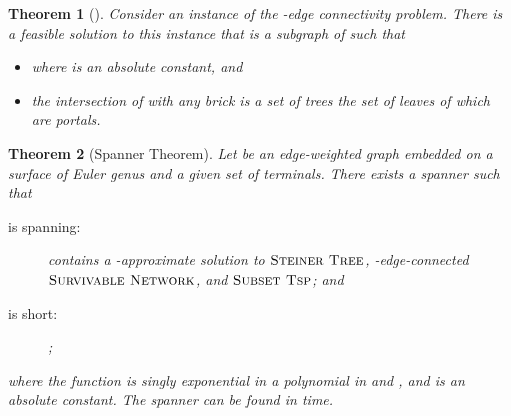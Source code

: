 \documentclass{article}
\newtheorem{theorem}{Theorem}
\newcommand{\myproblemname}[1]{\ensuremath{\mbox{\sc #1}}\xspace}
\newcommand{\steiner}{\myproblemname{Steiner Tree}}
\newcommand{\subtsp}{\myproblemname{Subset Tsp}}
\newcommand{\survive}{\myproblemname{Survivable Network}}
\begin{document}
\begin{theorem}[{\cite[Theorem~5]{BorradaileKlein08}}]\label{thm:2ec-trees}
  Consider an instance of the -edge connectivity problem.
  There is a feasible solution  to this instance that is a subgraph of
   such that 
  \begin{itemize}
  \item  where  is an absolute
    constant, and
  \item the intersection of  with any brick  is a set of 
    trees the set of leaves of which are portals.
  \end{itemize}
\end{theorem}



\begin{theorem}[Spanner Theorem]\label{thm:spanner}
  Let  be an edge-weighted graph embedded on a surface of Euler
  genus  and  a given set of terminals. There
  exists a spanner  such that
  \begin{description} \item[ is spanning:]  contains a -approximate solution to
    \steiner, -edge-connected \survive, and \subtsp; and
  \item[ is short:] ;
  \end{description}
  where the function  is singly exponential in a
  polynomial in  and , and  is an absolute
  constant. The spanner can be found in  time.
\end{theorem}
\end{document}
